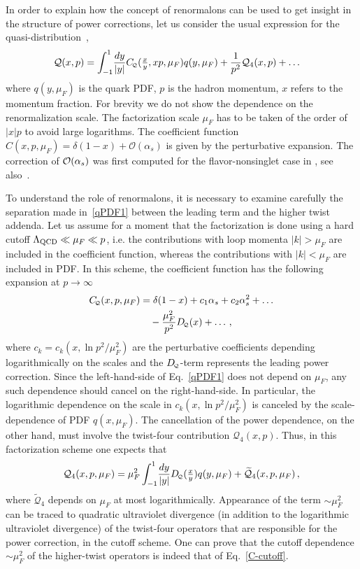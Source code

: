 In order to explain how the concept of renormalons can be used to get insight in the structure of power corrections, let us
consider the usual expression for the quasi-distribution~\cite{Ji:2015qla,Izubuchi:2018srq}, 
\begin{align}
\label{qPDF1}
 \mathcal{Q}(x,p) &= \int_{-1}^1 \!\frac{dy}{|y|} C_{\!\scriptscriptstyle \mathcal{Q}}(\tfrac{x}{y},xp,\mu_F) q(y,\mu_F) + \frac{1}{p^2}  \mathcal{Q}_4(x,p) + \ldots
\end{align}
where $q(y,\mu_F)$ is the quark PDF, $p$ is the hadron momentum, $x$ refers to the momentum fraction. For brevity we do not show the dependence on the renormalization scale. The factorization scale $\mu_F$ has to be taken of the order of $|x| p$ to avoid large logarithms.  The coefficient function $C(x,p,\mu_F) = \delta(1-x) + \mathcal{O}(\alpha_s)$ is given by the perturbative expansion. The correction of ${\cal O}(\alpha_s)$ was first computed for the flavor-nonsinglet case in \cite{Xiong:2013bka}, see also~\cite{Stewart:2017tvs}. 

To understand the role of renormalons, it is necessary to examine carefully the separation made in~\eqref{qPDF1} between the leading term and the higher twist addenda. Let us assume for a moment that the factorization is done using a hard cutoff $\Lambda_{\rm QCD} \ll \mu_F  \ll p$, i.e. the contributions with loop momenta $|k| > \mu_F$ are included  in the coefficient function, whereas the contributions with $|k| < \mu_F$ are included in PDF. In this scheme, 
the coefficient function has the following expansion at $p\to\infty$
\begin{align}
\label{C-cutoff}
 C_{\!\scriptscriptstyle \mathcal{Q}}(x,p,\mu_F) &= \delta(1-x) + c_1 \alpha_s + c_2\alpha_s^2 + \ldots 
\notag\\ &\quad{}
- \frac{\mu_F^2}{p^2} D_{\!\scriptscriptstyle \mathcal{Q}}(x) +\ldots\,,
\end{align}    
where $c_k= c_k(x,\ln p^2/\mu_F^2)$ are the perturbative coefficients depending logarithmically on the scales and the $D_{\!\scriptscriptstyle \mathcal{Q}}$-term represents the leading power correction. Since the left-hand-side of Eq.~\eqref{qPDF1} does not depend on $\mu_F$, any such dependence should cancel on the right-hand-side. In particular, the logarithmic dependence on the scale in $c_k(x,\ln p^2/\mu_F^2)$ is canceled by the scale-dependence of PDF $q(x,\mu_F)$. The cancellation of the power dependence, on the other hand, must involve the twist-four contribution $\mathcal{Q}_4(x,p)$. Thus, in this factorization scheme one expects that
\begin{align}
\label{Q4-cutoff}
 \mathcal{Q}_4(x,p,\mu_F) = \mu_F^2 \int_{-1}^1 \!\frac{dy}{|y|} D_{\!\scriptscriptstyle \mathcal{Q}}(\tfrac{x}{y}) q(y,\mu_F) + \widetilde{\mathcal{Q}}_4(x,p,\mu_F)\,,  
\end{align} 
where $\widetilde{\mathcal{Q}}_4$ depends on $\mu_F$ at most logarithmically. 
Appearance of the term $\sim \mu_F^2$ can be traced to quadratic ultraviolet divergence (in addition to the logarithmic ultraviolet divergence) 
of the twist-four operators that are responsible for the power correction, in the cutoff scheme. 
One can prove that the cutoff dependence $\sim \mu_F^2$ of the higher-twist operators is indeed that of Eq.~\eqref{C-cutoff}.    

